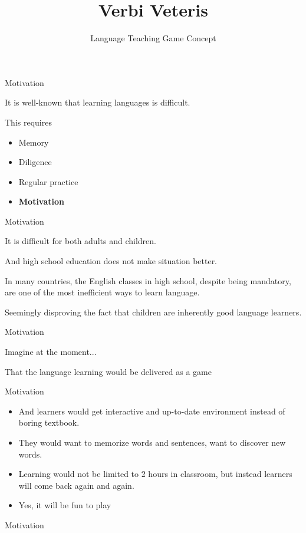 \documentclass[pdf]{beamer}
\title{Verbi Veteris}
\subtitle{Language Teaching Game Concept}
\newcommand{\red}[1]{{\color[rgb]{0.6,0,0}#1}}
\begin{document}
\begin{frame}\titlepage\end{frame}
\begin{frame}{Motivation}
	\begin{block}{}It is well-known that learning languages is difficult. \end{block}
	\pause
	\begin{block}{}This requires\begin{itemize}
		\item Memory \item Diligence \item Regular practice \item \textbf{Motivation}\end{itemize}
	\end{block}
\end{frame}
\begin{frame}{Motivation}
	\begin{block}{}
		It is difficult for both adults and children.
	\end{block}
	\pause
	\begin{block}{}
		And high school education does not make situation better.
	\end{block}
	\pause
	\begin{block}{}
		In many countries, the English classes in high school, despite being mandatory, are one of the most
		\red{inefficient} ways to learn language.
	\end{block}
	\pause
	\begin{block}{}
		Seemingly disproving the fact that children are inherently good language learners.
	\end{block}
\end{frame}
\begin{frame}{Motivation}
	\begin{center}{\Huge Imagine at the moment...}\end{center}
	\pause
	\begin{center}{\huge That the language learning would be delivered as a \red{game}}\end{center}
\end{frame}
\begin{frame}{Motivation}
	\begin{itemize}
		\large
		\item<1-> And learners would get interactive and up-to-date environment instead of boring textbook.
		\item<2-> They would \red{want} to memorize words and sentences, want to discover new words.
		\item<3-> Learning would not be limited to 2 hours in classroom, but instead learners will come back again and again.
		\item<4-> Yes, it will be fun to play
	\end{itemize}
\end{frame}
\begin{frame}{Motivation}
\end{frame}
\end{document}
